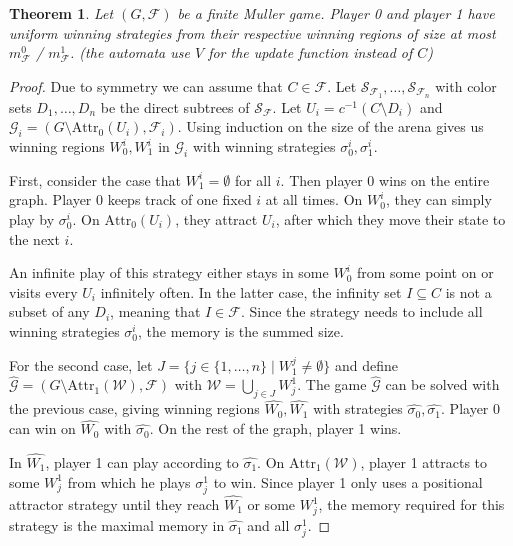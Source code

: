 \documentclass{article}
\newtheorem{theorem}{Theorem}
\begin{document}
\vspace{0.5cm}
\begin{theorem}
	Let $(G, \mathcal{F})$ be a finite Muller game. Player 0 and player 1 have uniform winning strategies from their respective winning regions of size at most $m^0_\mathcal{F}$ / $m^1_\mathcal{F}$. (the automata use $V$ for the update function instead of $C$)
\end{theorem}
\begin{proof}
	Due to symmetry we can assume that $C \in \mathcal{F}$. Let $\mathcal{S}_{\mathcal{F}_1}, \dots, \mathcal{S}_{\mathcal{F}_n}$ with color sets $D_1, \dots, D_n$ be the direct subtrees of $\mathcal{S}_\mathcal{F}$. Let $U_i = c^{-1}(C \setminus D_i)$ and $\mathcal{G}_i = (G \setminus \text{Attr}_0(U_i), \mathcal{F}_i)$. Using induction on the size of the arena gives us winning regions $W_0^i, W_1^i$ in $\mathcal{G}_i$ with winning strategies $\sigma_0^i, \sigma_1^i$.
	
	First, consider the case that $W_1^i = \emptyset$ for all $i$. Then player 0 wins on the entire graph. Player 0 keeps track of one fixed $i$ at all times. On $W_0^i$, they can simply play by $\sigma^i_0$. On $\text{Attr}_0(U_i)$, they attract $U_i$, after which they move their state to the next $i$. 
	
	An infinite play of this strategy either stays in some $W_0^i$ from some point on or visits every $U_i$ infinitely often. In the latter case, the infinity set $I \subseteq C$ is not a subset of any $D_i$, meaning that $I \in \mathcal{F}$. Since the strategy needs to include all winning strategies $\sigma_0^i$, the memory is the summed size.
	
	For the second case, let $J = \{ j \in \{1, \dots, n\} \mid W^j_1 \neq \emptyset \}$ and define $\hat{\mathcal{G}} = (G \setminus \text{Attr}_1(\mathcal{W}), \mathcal{F})$ with $\mathcal{W} = \bigcup_{j \in J} W^1_j$. The game $\hat{\mathcal{G}}$ can be solved with the previous case, giving winning regions $\hat{W_0}, \hat{W_1}$ with strategies $\hat{\sigma_0}, \hat{\sigma_1}$. Player 0 can win on $\hat{W_0}$ with $\hat{\sigma_0}$. On the rest of the graph, player 1 wins.
	
	In $\hat{W_1}$, player 1 can play according to $\hat{\sigma_1}$. On $\text{Attr}_1(\mathcal{W})$, player 1 attracts to some $W^1_j$ from which he plays $\sigma^1_j$ to win. Since player 1 only uses a positional attractor strategy until they reach $\hat{W_1}$ or some $W^1_j$, the memory required for this strategy is the maximal memory in $\hat{\sigma_1}$ and all $\sigma^1_j$.
\end{proof}
\end{document}
